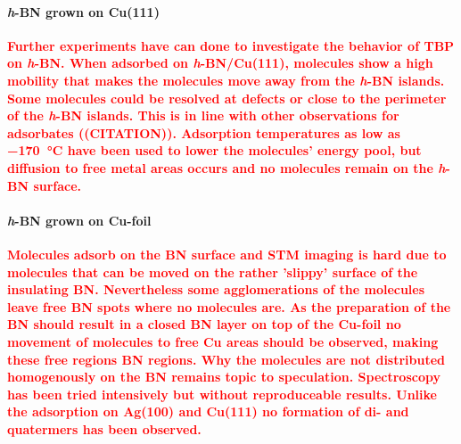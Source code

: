 \paragraph{\textit{h}-BN grown on Cu(111)}
\textcolor{red}{\textbf{
Further experiments have can done to investigate the behavior of TBP on \textit{h}-BN. When adsorbed on \textit{h}-BN/Cu(111), molecules show a high mobility that makes the molecules move away from the \textit{h}-BN islands. Some molecules could be resolved at defects or close to the perimeter of the \textit{h}-BN islands. This is in line with other observations for adsorbates ((CITATION)). Adsorption temperatures as low as \SI{-170}{\celsius} have been used to lower the molecules' energy pool, but diffusion to free metal areas occurs and no molecules remain on the \textit{h}-BN surface.
}}

\paragraph{\textit{h}-BN grown on Cu-foil}
\textcolor{red}{\textbf{
Molecules adsorb on the BN surface and STM imaging is hard due to molecules that can be moved on the rather 'slippy' surface of the insulating BN. Nevertheless some agglomerations of the molecules leave free BN spots where no molecules are. As the preparation of the BN should result in a closed BN layer on top of the Cu-foil no movement of molecules to free Cu areas should be observed, making these free regions BN regions.
Why the molecules are not distributed homogenously on the BN remains topic to speculation.
Spectroscopy has been tried intensively but without reproduceable results.
Unlike the adsorption on Ag(100) and Cu(111) no formation of di- and quatermers has been observed.
}}